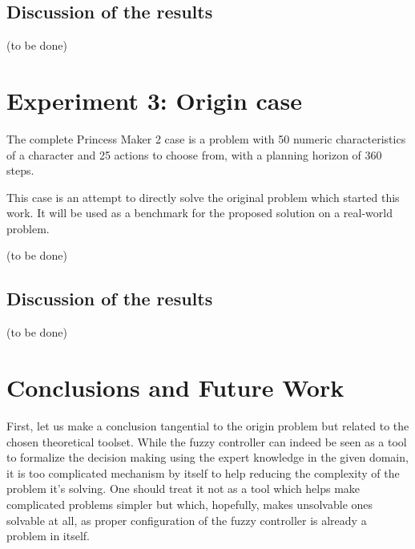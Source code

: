 \documentclass[12pt, a4paper]{article}
\begin{document}
	\subsection{Discussion of the results}
		(to be done)
		
	\section{Experiment 3: Origin case}

	The complete Princess Maker 2 case is a problem with 50 numeric characteristics of a character and 25 actions to choose from, with a planning horizon of 360 steps.

	This case is an attempt to directly solve the original problem which started this work.
	It will be used as a benchmark for the proposed solution on a real-world problem.

	(to be done)
	
		\subsection{Discussion of the results}
		(to be done)


	
	\section{Conclusions and Future Work}

	First, let us make a conclusion tangential to the origin problem but related to the chosen theoretical toolset.
	While the fuzzy controller can indeed be seen as a tool to formalize the decision making using the expert knowledge in the given domain, it is too complicated mechanism by itself to help reducing the complexity of the problem it's solving.
	One should treat it not as a tool which helps make complicated problems simpler but which, hopefully, makes unsolvable ones solvable at all, as proper configuration of the fuzzy controller is already a problem in itself.
\end{document}
